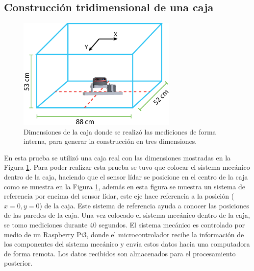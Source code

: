 
\subsection{Construcción tridimensional de una caja}
\label{sec:MapaCaja}
\begin{figure}
  \centering \footnotesize
  \includegraphics[width=0.70\textwidth]{images/3DLidar.eps}
  \captionsetup{font=footnotesize}
  \caption{Dimensiones de la caja donde se realizó las mediciones de forma interna, para
  generar la construcción en tres dimensiones.}
  \label{fig:dim_cajaReal}
\end{figure}

En esta prueba se utilizó una caja real con las dimensiones mostradas en 
la Figura \ref{fig:dim_cajaReal}. Para poder realizar esta prueba se tuvo que
colocar el sistema mecánico dentro de la caja, haciendo que el sensor lídar 
se posicione en el centro de la caja como se muestra en la Figura 
\ref{fig:dim_cajaReal}, además en esta figura se muestra un sistema de referencia por 
encima del sensor lídar, este eje hace referencia a la posición ($x = 0, y = 0$) 
de la caja. Este sistema de referencia ayuda a conocer las posiciones de las paredes de 
la caja. Una vez colocado el sistema mecánico dentro de la caja, se 
tomo mediciones durante 40 segundos. El sistema mecánico es controlado por
medio de un Raspberry Pi3, donde el microcontrolador recibe la información 
de los componentes del sistema mecánico y envía estos datos hacia una computadora
de forma remota. Los datos recibidos son almacenados para el procesamiento posterior.

